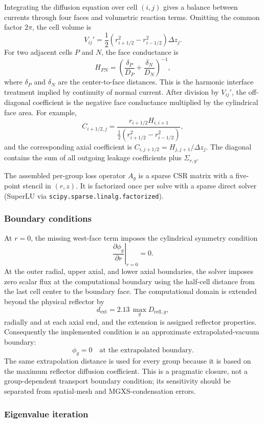\documentclass[11pt]{article}
\begin{document}
Integrating the diffusion equation over cell $(i,j)$ gives a balance between
currents through four faces and volumetric reaction terms.  Omitting the
common factor $2\pi$, the cell volume is
\[
V_{ij}' =
\frac{1}{2}\left(r_{i+1/2}^{2}-r_{i-1/2}^{2}\right)\Delta z_j .
\]
For two adjacent cells $P$ and $N$, the face conductance is
\[
H_{PN}
=
\left(
\frac{\delta_P}{D_P}+\frac{\delta_N}{D_N}
\right)^{-1},
\]
where $\delta_P$ and $\delta_N$ are the center-to-face distances.  This is the
harmonic interface treatment implied by continuity of normal current.  After
division by $V_{ij}'$, the off-diagonal coefficient is the negative face
conductance multiplied by the cylindrical face area.  For example,
\[
C_{i+1/2,j}
=
\frac{r_{i+1/2}H_{i,i+1}}
{\tfrac12(r_{i+1/2}^{2}-r_{i-1/2}^{2})},
\]
and the corresponding axial coefficient is
$C_{i,j+1/2}=H_{j,j+1}/\Delta z_j$.  The diagonal contains the sum of all
outgoing leakage coefficients plus $\Sigma_{r,g}$.

The assembled per-group loss operator $A_g$ is a sparse CSR matrix with a
five-point stencil in $(r,z)$.  It is factorized once per solve with a sparse
direct solver (SuperLU via \texttt{scipy.sparse.linalg.factorized}).

\subsubsection{Boundary conditions}

At $r=0$, the missing west-face term imposes the cylindrical symmetry
condition
\[
\left.\frac{\partial\phi_g}{\partial r}\right|_{r=0}=0 .
\]
At the outer radial, upper axial, and lower axial boundaries, the solver
imposes zero scalar flux at the computational boundary using the half-cell
distance from the last cell center to the boundary face.  The computational
domain is extended beyond the physical reflector by
\[
d_{\mathrm{ext}} = 2.13\,\max_g D_{\mathrm{refl},g},
\]
radially and at each axial end, and the extension is assigned reflector
properties.  Consequently the implemented condition is an approximate
extrapolated-vacuum boundary:
\[
\phi_g=0
\quad\text{at the extrapolated boundary.}
\]
The same extrapolation distance is used for every group because it is based on
the maximum reflector diffusion coefficient.  This is a pragmatic closure,
not a group-dependent transport boundary condition; its sensitivity should be
separated from spatial-mesh and MGXS-condensation errors.

\subsubsection{Eigenvalue iteration}
\end{document}

